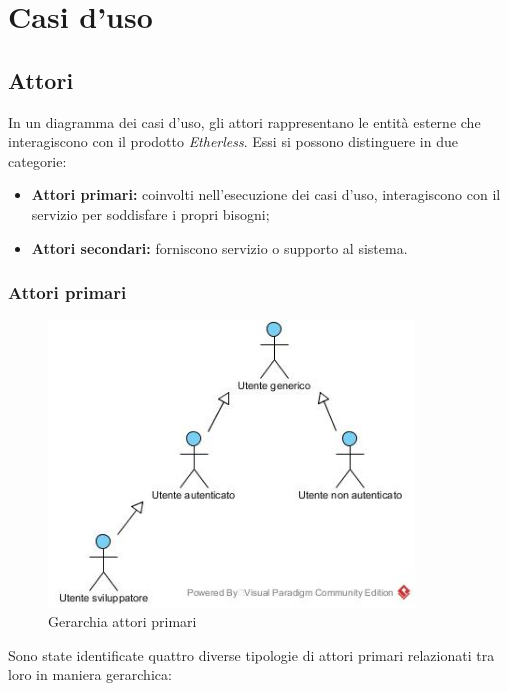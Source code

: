 \section{Casi d'uso}

\subsection{Attori}
In un diagramma dei casi d'uso, gli attori rappresentano le entità esterne che interagiscono con il prodotto \textit{Etherless}. Essi si possono distinguere in due categorie:
\begin{itemize}
	\item \textbf{Attori primari:} coinvolti nell'esecuzione dei casi d'uso, interagiscono con il servizio per soddisfare i propri bisogni;
	\item \textbf{Attori secondari:} forniscono servizio o supporto al sistema.
\end{itemize}

\subsubsection{Attori primari}
\begin{figure}[h]
	\centering
	\includegraphics[width=9.7cm]{res/img/gerarchiaAttoriPrimari.jpg}
	\caption{Gerarchia attori primari}
\end{figure}

Sono state identificate quattro diverse tipologie di attori primari relazionati tra loro in maniera gerarchica:

